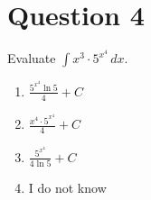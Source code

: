 
\section*{Question 4}
Evaluate $\displaystyle\int x^3\cdot 5^{x^4}\,dx$.
    
\begin{enumerate}[label = \alph*.]
    \item $\displaystyle\frac{5^{x^4}\ln 5}{4}+C$
    \item $\displaystyle\frac{x^4\cdot 5^{x^4}}{4}+C$
    \item $\displaystyle\frac{5^{x^4}}{4\ln 5}+C$
    \item I do not know
\end{enumerate}

\setcounter{solutionMainStep}{0}
\setcounter{solutionSubStep}{0}

